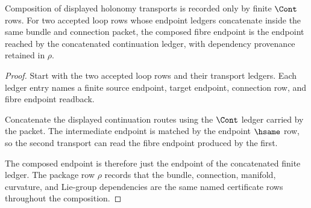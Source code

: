 \begin{theorem}
\label{thm:holonomy-composition-ledger-obligation}
Composition of displayed holonomy transports is recorded only by finite $\Cont$ rows. For two accepted loop rows whose endpoint ledgers concatenate inside the same bundle and connection packet, the composed fibre endpoint is the endpoint reached by the concatenated continuation ledger, with dependency provenance retained in $\rho$.
\end{theorem}
\begin{proof}
Start with the two accepted loop rows and their transport ledgers. Each ledger entry names a finite source endpoint, target endpoint, connection row, and fibre endpoint readback.

Concatenate the displayed continuation routes using the $\Cont$ ledger carried by the packet. The intermediate endpoint is matched by the endpoint $\hsame$ row, so the second transport can read the fibre endpoint produced by the first.

The composed endpoint is therefore just the endpoint of the concatenated finite ledger. The package row $\rho$ records that the bundle, connection, manifold, curvature, and Lie-group dependencies are the same named certificate rows throughout the composition.
\end{proof}

